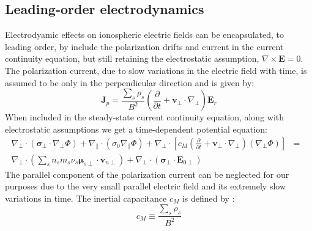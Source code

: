 \documentclass[11pt,letterpaper]{article}
\begin{document}
\subsection{Leading-order electrodynamics} \label{sec:electrodynamics}

Electrodyamic effects on ionospheric electric fields can be encapsulated, to leading order, by include the polarization drifts and current in the current continuity equation, but still retaining the electrostatic assumption, $\nabla \times \mathbf{E}=0$.  The polarization current, due to slow variations in the electric field with time, is assumed to be only in the perpendicular direction and is given by:  
\begin{equation}
\mathbf{J}_p = \frac{\sum_s \rho_s}{B^2} \left( \frac{\partial}{\partial t}  + \mathbf{v}_\perp \cdot \nabla_\perp \right) \mathbf{E}_r
\end{equation}
When included in the steady-state current continuity equation, along with electrostatic assumptions we get a time-dependent potential equation:  
\begin{eqnarray}
  \nabla_\perp \cdot \left( \boldsymbol{\sigma}_\perp \cdot \nabla_\perp \Phi \right) + \nabla_\parallel \cdot \left( \sigma_0 \nabla_\parallel \Phi \right) + \nabla_\perp \cdot \left[ c_M \left( \frac{\partial}{\partial t}  + \mathbf{v}_\perp \cdot \nabla_\perp \right) \left( \nabla_\perp \Phi \right) \right]  &=& \nonumber \\ \nabla_\perp \cdot \left( \sum_s n_s m_s \nu_s \boldsymbol{\mu}_{s\perp} \cdot \mathbf{v}_{n\perp} \right) + \nabla_\perp \cdot \left( \boldsymbol{\sigma}_\perp \cdot \mathbf{E}_{0\perp} \right) \label{eqn:electrodynamic}
\end{eqnarray}
The parallel component of the polarization current can be neglected for our purposes due to the very small parallel electric field and its extremely slow variations in time.  The inertial capacitance $c_M$ is defined by \citep{Mitchell:1985}:  
\begin{equation}
c_M \equiv \frac{\sum_s \rho_s}{B^2}
\end{equation}
\end{document}
